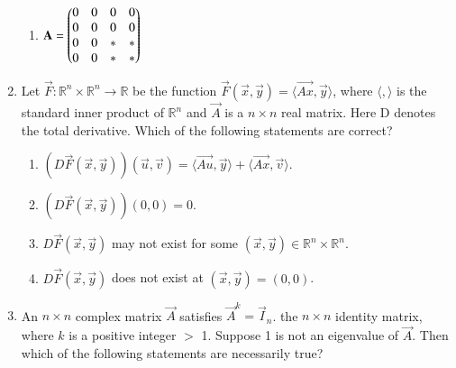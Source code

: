 \begin{enumerate}[label=\thesection.\arabic*.,ref=\thesection.\theenumi]
\begin{enumerate}
    \item $\mathbf{A} = \begin{pmatrix}0 & 0 & 0 & 0 \\ 0 & 0 & 0 & 0 \\ 0 & 0 & * & * \\ 0 & 0 & * & *\end{pmatrix}$
\end{enumerate}
%
%
\solution

\item %
Let $\vec{F}:\mathbb{R}^n\times\mathbb{R}^n\rightarrow\mathbb{R}$ be the function $\vec{F}(\vec{x},\vec{y})=\langle\vec{Ax},\vec{y}\rangle$, where $\langle,\rangle$ is the standard inner product of $\mathbb{R}^n$ and $\vec{A}$ is a $n\times n$ real matrix. Here D denotes the total derivative. Which of the following statements are correct?
\begin{enumerate}
    \item $(D\vec{F}(\vec{x},\vec{y}))(\vec{u},\vec{v})=\langle\vec{Au},\vec{y}\rangle+\langle\vec{Ax},\vec{v}\rangle$.
    \item $(D\vec{F}(\vec{x},\vec{y}))(0,0)=0$.
    \item $D\vec{F}(\vec{x},\vec{y})$ may not exist for some $(\vec{x},\vec{y})\in\mathbb{R}^n\times\mathbb{R}^n$.
    \item $D\vec{F}(\vec{x},\vec{y})$ does not exist at $(\vec{x},\vec{y})=(0,0)$.
\end{enumerate}
%
%
\solution

\item 	%
	An $n\times n$ complex matrix $\vec{A}$ satisfies $\vec{A}^{k} = \vec{I}_n$. the $n\times n$ identity matrix, where $k$ is a positive integer $>$ 1. Suppose 1 is not an eigenvalue of $\vec{A}$. Then which of the following statements are necessarily true?\\
	

\end{enumerate}
